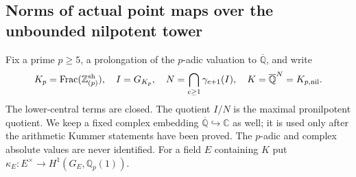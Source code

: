 \subsection{Norms of actual point maps over the unbounded nilpotent tower}

Fix a prime $p\geq5$, a prolongation of the $p$-adic valuation to
$\overline{\mathbb Q}$, and write
\[
 K_p=\operatorname{Frac}(\mathbb Z_{(p)}^{\rm sh}),\quad
 I=G_{K_p},\quad N=\bigcap_{c\geq1}\gamma_{c+1}(I),\quad
 K=\overline{\mathbb Q}^{N}=K_{p,\rm nil}.
\]
The lower-central terms are closed.  The quotient $I/N$ is the
maximal pronilpotent quotient.  We keep a fixed complex embedding
$\overline{\mathbb Q}\hookrightarrow\mathbb C$ as well; it is
used only after the arithmetic Kummer statements have been proved.
The $p$-adic and complex absolute values are never identified.
For a field $E$ containing $K$ put
$\kappa_E:E^\times\to H^1(G_E,\mathbb Q_p(1))$.


